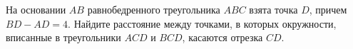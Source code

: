 \begin{ex}
	\begin{condition}
		На основании \( AB  \) равнобедренного треугольника	\( ABC  \) взята точка \( D \), причем \( BD-AD = 4  \). Найдите расстояние между точками, в которых окружности, вписанные в треугольники \( ACD  \) и \( BCD \), касаются отрезка \( CD \).
	\end{condition}
\end{ex}